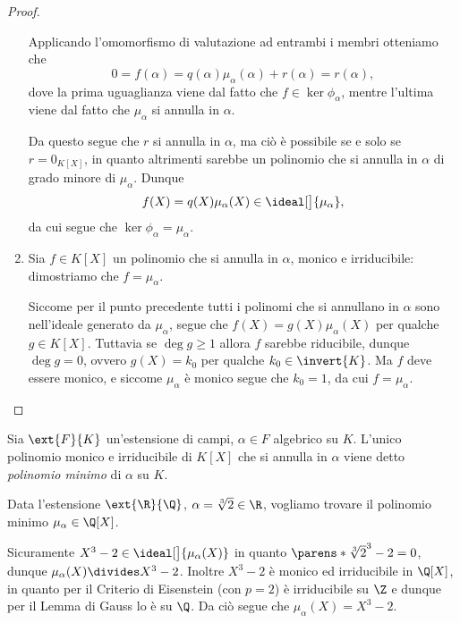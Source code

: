 \begin{proof}
\begin{enumerate}[label={(\roman*)}]
        Applicando l'omomorfismo di valutazione ad entrambi i membri otteniamo che \[
            0 = f(\alpha) = q(\alpha)\mu_\alpha(\alpha) + r(\alpha) = r(\alpha),
        \] dove la prima uguaglianza viene dal fatto che $f \in \ker \phi_\alpha$, mentre l'ultima viene dal fatto che $\mu_\alpha$ si annulla in $\alpha$.

        Da questo segue che $r$ si annulla in $\alpha$, ma ciò è possibile se e solo se $r = 0_{K[X]}$, in quanto altrimenti sarebbe un polinomio che si annulla in $\alpha$ di grado minore di $\mu_\alpha$. Dunque \[
            f(X) = q(X)\mu_\alpha(X) \in \ideal[\big]{\mu_\alpha}, 
        \] da cui segue che $\ker \phi_\alpha = \mu_\alpha$.
        \item Sia $f \in K[X]$ un polinomio che si annulla in $\alpha$, monico e irriducibile: dimostriamo che $f = \mu_\alpha$.
        
        Siccome per il punto precedente tutti i polinomi che si annullano in $\alpha$ sono nell'ideale generato da $\mu_\alpha$, segue che $f(X) = g(X)\mu_\alpha(X)$ per qualche $g \in K[X]$. Tuttavia se $\deg g \geq 1$ allora $f$ sarebbe riducibile, dunque $\deg g = 0$, ovvero $g(X) = k_0$ per qualche $k_0 \in \invert{K}$. Ma $f$ deve essere monico, e siccome $\mu_\alpha$ è monico segue che $k_0 = 1$, da cui $f = \mu_\alpha$. \qedhere
    \end{enumerate}
\end{proof}

\begin{definition}
     Sia $\ext{F}{K}$ un'estensione di campi, $\alpha \in F$ algebrico su $K$. L'unico polinomio monico e irriducibile di $K[X]$ che si annulla in $\alpha$ viene detto \emph{polinomio minimo} di $\alpha$ su $K$.
\end{definition}

\begin{example}
    Data l'estensione $\ext{\R}{\Q}$, $\alpha = \sqrt[3]{2} \in \R$, vogliamo trovare il polinomio minimo $\mu_\alpha \in \Q[X]$.

    Sicuramente $X^3 - 2 \in \ideal[\big]{\mu_\alpha(X)}$ in quanto $\parens*{\sqrt[3]{2}}^3 - 2 = 0$, dunque $\mu_\alpha(X) \divides X^3 - 2$. Inoltre $X^3 - 2$ è monico ed irriducibile in $\Q[X]$, in quanto per il Criterio di Eisenstein (con $p = 2$) è irriducibile su $\Z$ e dunque per il Lemma di Gauss lo è su $\Q$. Da ciò segue che $\mu_\alpha(X) = X^3 - 2$.
\end{example}

